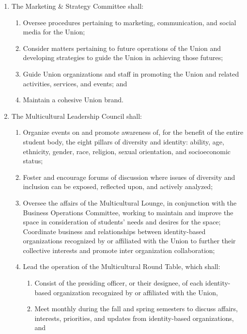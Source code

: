 \documentclass{uniondoc}
\begin{document}
\begin{enumerate}
\begin{enumerate}
  \item Oversee the pursuit of special projects initiated by the President by collaborating with the appropriate committees, groups, students, and staff and developing recommendations to the President and the Executive Board where appropriate.
  \end{enumerate}
\item The Marketing \& Strategy Committee shall:
  \begin{enumerate}
  \item Oversee procedures pertaining to marketing, communication, and social media for the Union;
  \item Consider matters pertaining to future operations of the Union and developing strategies to guide the Union in achieving those futures;
  \item Guide Union organizations and staff in promoting the Union and related activities, services, and events; and
  \item Maintain a cohesive Union brand.
  \end{enumerate}
\item The Multicultural Leadership Council shall:
  \begin{enumerate}
  \item Organize events on and promote awareness of, for the benefit of the entire student body, the eight pillars of diversity and identity: ability, age, ethnicity, gender, race, religion, sexual orientation, and socioeconomic status;
  \item Foster and encourage forums of discussion where issues of diversity and inclusion can be exposed, reflected upon, and actively analyzed;
  \item Oversee the affairs of the Multicultural Lounge, in conjunction with the Business Operations Committee, working to maintain and improve the space in consideration of students’ needs and desires for the space; Coordinate business and relationships between identity-based organizations recognized by or affiliated with the Union to further their collective interests and promote inter organization collaboration;
  \item Lead the operation of the Multicultural Round Table, which shall:
    \begin{enumerate}
    \item Consist of the presiding officer, or their designee, of each identity-based organization recognized by or affiliated with the Union,
    \item Meet monthly during the fall and spring semesters to discuss affairs, interests, priorities, and updates from identity-based organizations, and

\end{enumerate}
\end{enumerate}
\end{enumerate}
\end{document}
